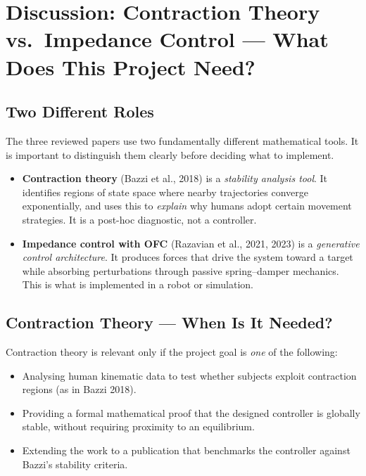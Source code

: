 \documentclass[11pt]{article}
\begin{document}


\section{Discussion: Contraction Theory vs.\ Impedance Control --- What Does This Project Need?}

\subsection*{Two Different Roles}

The three reviewed papers use two fundamentally different mathematical tools.
It is important to distinguish them clearly before deciding what to implement.

\begin{itemize}
    \item \textbf{Contraction theory} (Bazzi et al., 2018) is a \emph{stability analysis tool}.
          It identifies regions of state space where nearby trajectories converge
          exponentially, and uses this to \emph{explain} why humans adopt certain
          movement strategies.  It is a post-hoc diagnostic, not a controller.

    \item \textbf{Impedance control with OFC} (Razavian et al., 2021, 2023) is a
          \emph{generative control architecture}.  It produces forces that drive the
          system toward a target while absorbing perturbations through passive
          spring--damper mechanics.  This is what is implemented in a robot or simulation.
\end{itemize}

\subsection*{Contraction Theory --- When Is It Needed?}

Contraction theory is relevant only if the project goal is \emph{one} of the following:

\begin{itemize}
    \item Analysing human kinematic data to test whether subjects exploit contraction
          regions (as in Bazzi 2018).
    \item Providing a formal mathematical proof that the designed controller is
          globally stable, without requiring proximity to an equilibrium.
    \item Extending the work to a publication that benchmarks the controller against
          Bazzi's stability criteria.
\end{itemize}
\end{document}
